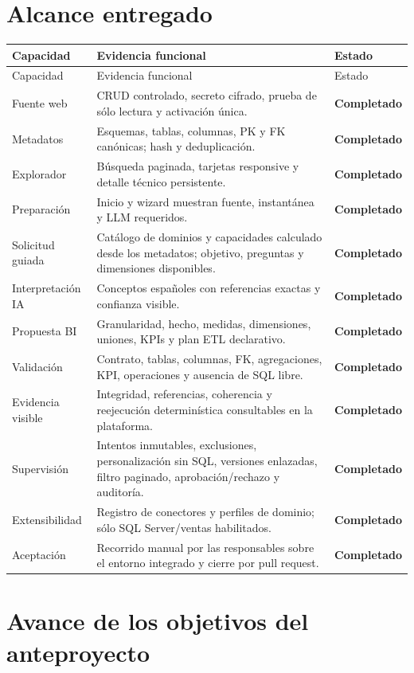 \documentclass[11pt,letterpaper]{article}
\newcommand{\ok}{\textcolor{success}{\textbf{Completado}}}
\begin{document}
\section{Alcance entregado}

\begin{longtable}{@{}p{}p{}p{}@{}}
  \toprule
  Capacidad & Evidencia funcional & Estado \\
  \midrule
  \endfirsthead
  \toprule
  Capacidad & Evidencia funcional & Estado \\
  \midrule
  \endhead
  Fuente web & CRUD controlado, secreto cifrado, prueba de sólo lectura y activación única. & \ok \\
  Metadatos & Esquemas, tablas, columnas, PK y FK canónicas; hash y deduplicación. & \ok \\
  Explorador & Búsqueda paginada, tarjetas responsive y detalle técnico persistente. & \ok \\
  Preparación & Inicio y wizard muestran fuente, instantánea y LLM requeridos. & \ok \\
  Solicitud guiada & Catálogo de dominios y capacidades calculado desde los metadatos; objetivo, preguntas y dimensiones disponibles. & \ok \\
  Interpretación IA & Conceptos españoles con referencias exactas y confianza visible. & \ok \\
  Propuesta BI & Granularidad, hecho, medidas, dimensiones, uniones, KPIs y plan ETL declarativo. & \ok \\
  Validación & Contrato, tablas, columnas, FK, agregaciones, KPI, operaciones y ausencia de SQL libre. & \ok \\
  Evidencia visible & Integridad, referencias, coherencia y reejecución determinística consultables en la plataforma. & \ok \\
  Supervisión & Intentos inmutables, exclusiones, personalización sin SQL, versiones enlazadas, filtro paginado, aprobación/rechazo y auditoría. & \ok \\
  Extensibilidad & Registro de conectores y perfiles de dominio; sólo SQL Server/ventas habilitados. & \ok \\
  Aceptación & Recorrido manual por las responsables sobre el entorno integrado y cierre por pull request. & \ok \\
  \bottomrule
\end{longtable}

\section{Avance de los objetivos del anteproyecto}
\end{document}
